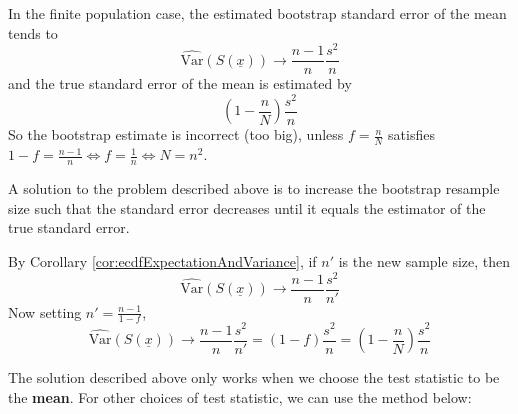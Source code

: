 \begin{remark}
	In the finite population case, the estimated bootstrap standard error of the mean tends to
	\[
		\widehat{\text{Var}}(S(\underline{x})) \rightarrow \frac{n - 1}{n} \frac{s^2}{n}
	\]
	and the true standard error of the mean is estimated by
	\[
		\left( 1 - \frac{n}{N} \right) \frac{s^2}{n}
	\]
	So the bootstrap estimate is incorrect (too big), unless $f = \frac{n}{N}$ satisfies $1 - f = \frac{n - 1}{n} \Longleftrightarrow f = \frac{1}{n} \Longleftrightarrow N = n^2$.
\end{remark}

\begin{remark}
	A solution to the problem described above is to increase the bootstrap resample size such that the standard error decreases until it equals the estimator of the true standard error.

	By Corollary \ref{cor:ecdfExpectationAndVariance}, if $n'$ is the new sample size, then
	\[
		\widehat{\text{Var}}(S(\underline{x})) \rightarrow \frac{n - 1}{n} \frac{s^2}{n'}
	\]
	Now setting $n' = \frac{n - 1}{1 - f}$,
	\[
		\widehat{\text{Var}}(S(\underline{x})) \rightarrow \frac{n - 1}{n} \frac{s^2}{n'} = (1 - f) \frac{s^2}{n} = \left( 1 - \frac{n}{N} \right) \frac{s^2}{n}
	\]
\end{remark}

\begin{remark}
	The solution described above only works when we choose the test statistic to be the \textbf{mean}. For other choices of test statistic, we can use the method below:
\end{remark}


